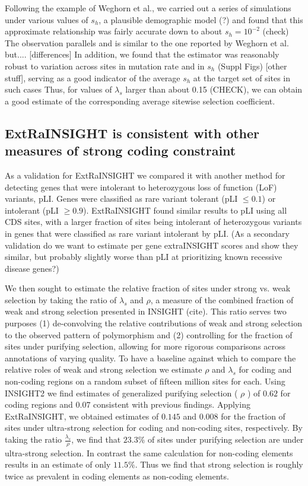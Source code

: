 \documentclass[11pt]{article}
\begin{document}
Following the example of Weghorn et al., we carried out a series of simulations 
under various values of $s_h$, 
a plausible demographic model (?)
and found that this approximate relationship was fairly accurate down to about $s_h = 10^{-2}$ (check)
The observation parallels and is similar to the one reported by Weghorn et al. but.... [differences]
In addition, we  found that the estimator was reasonably robust to variation across sites in mutation rate and in $s_h$ (Suppl Figs)   [other stuff], serving as a good indicator of the average $s_h$ at the target set of sites in such cases
Thus, for values of $\lambda_s$ larger than about 0.15 (CHECK), we can obtain a good estimate of the corresponding average sitewise selection coefficient.

\subsection*{ExtRaINSIGHT is consistent with other measures of strong coding constraint}
As a validation for ExtRaINSIGHT we compared it with another method for detecting genes that were intolerant to heterozygous loss of function (LoF) variants, pLI. Genes were classified as rare variant tolerant (pLI $\leq 0.1$) or intolerant (pLI $\geq 0.9$). ExtRaINSIGHT found similar results to pLI using all CDS sites, with a larger fraction of sites being intolerant of heterozygous variants in genes that were classified as rare variant intolerant by pLI.  (As a secondary validation do we want to estimate per gene extraINSIGHT scores and show they similar, but probably slightly worse than pLI at prioritizing known recessive disease genes?) 

We then sought to estimate the relative fraction of sites under strong vs. weak selection by taking the ratio of $\lambda_s$ and $\rho$, a measure of the combined fraction of weak and strong selection presented in INSIGHT (cite). This ratio serves two purposes (1) de-convolving the relative contributions of weak and strong selection to the observed pattern of polymorphism and (2) controlling for the fraction of sites under purifying selection, allowing for more rigorous comparisons across annotations of varying quality. To have a baseline against which to compare the relative roles of weak and strong selection we estimate $\rho$ and $\lambda_s$ for coding and non-coding regions on a random subset of fifteen million sites for each. Using INSIGHT2 we find estimates of generalized purifying selection ( $\rho$ ) of $0.62$ for coding regions and $0.07$ consistent with previous findings. Applying ExtRaINSIGHT, we obtained estimates of $0.145$ and $0.008$ for the fraction of sites under ultra-strong selection for coding and non-coding sites, respectively. By taking the ratio $\frac{\lambda_s}{\rho}$, we find that $23.3\%$ of sites under purifying selection are under ultra-strong selection. In contrast the same calculation for non-coding elements results in an estimate of only $11.5\%$. Thus we find that strong selection is roughly twice as prevalent in coding elements as non-coding elements.
\end{document}
